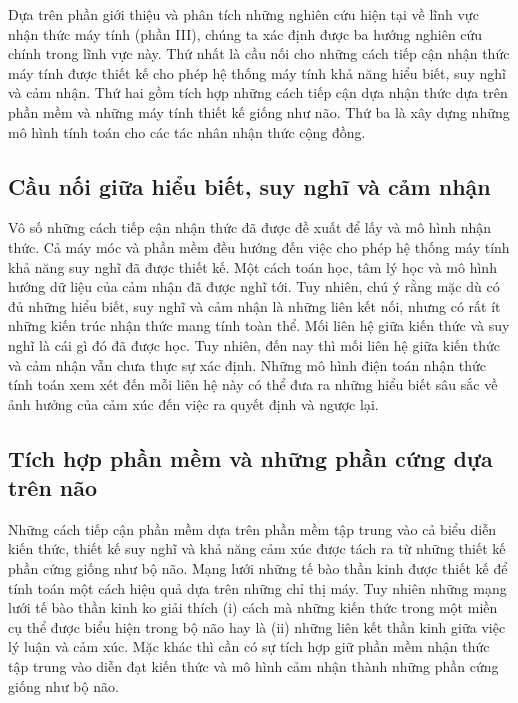 \documentclass{article}
\begin{document}
Dựa trên phần giới thiệu và phân tích những nghiên cứu hiện tại về lĩnh vực nhận thức máy tính (phần III), chúng ta xác định được ba hướng nghiên cứu chính trong lĩnh vực này. Thứ nhất là cầu nối cho những cách tiếp cận nhận thức máy tính được thiết kế cho phép hệ thống máy tính khả năng hiểu biết, suy nghĩ và cảm nhận. Thứ hai gồm tích hợp những cách tiếp cận dựa nhận thức dựa trên phần mềm và những máy tính thiết kế giống như não. Thứ ba là xây dựng những mô hình tính toán cho các tác nhân nhận thức cộng đồng.

\subsection{Cầu nối giữa hiểu biết, suy nghĩ và cảm nhận} \label{sec:5a-bridge}

Vô số những cách tiếp cận nhận thức đã được đề xuất để lấy và mô hình nhận thức. Cả máy móc và phần mềm đều hướng đến việc cho phép hệ thống máy tính khả năng suy nghĩ đã được thiết kế. Một cách toán học, tâm lý học và mô hình hướng dữ liệu của cảm nhận đã được nghĩ tới. Tuy nhiên, chú ý rằng mặc dù có đủ những hiểu biết, suy nghĩ và cảm nhận là những liên kết nối, nhưng có rất ít những kiến trúc nhận thức mang tính toàn thể. Mối liên hệ giữa kiến thức và suy nghĩ là cái gì đó đã được học. Tuy nhiên, đến nay thì mối liên hệ giữa kiến thức và cảm nhận vẫn chưa thực sự xác định. Những mô hình điện toán nhận thức tính toán xem xét đến mỗi liên hệ này có thể đưa ra những hiểu biết sâu sắc về ảnh hưởng của cảm xúc đến việc ra quyết định và ngược lại.

\subsection{Tích hợp phần mềm và những phần cứng dựa trên não}\label{sec:5b-integrated-software}

Những cách tiếp cận phần mềm dựa trên phần mềm tập trung vào cả biểu diễn kiến thức, thiết kế suy nghĩ và khả năng cảm xúc được tách ra từ những thiết kế phần cứng giống như bộ não. Mạng lưới những tế bào thần kinh được thiết kế để tính toán một cách hiệu quả dựa trên những chỉ thị máy. Tuy nhiên những mạng lưới tế bào thần kinh ko giải thích (i) cách mà những kiến thức trong một miền cụ thể được biểu hiện trong bộ não hay là (ii) những liên kết thần kinh giữa việc lý luận và cảm xúc. Mặc khác thì cần có sự tích hợp giữ phần mềm nhận thức tập trung vào diễn đạt kiến thức và mô hình cảm nhận thành những phần cứng giống như bộ não.
\end{document}
